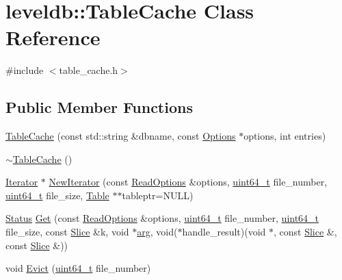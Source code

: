 \hypertarget{classleveldb_1_1_table_cache}{}\section{leveldb\+:\+:Table\+Cache Class Reference}
\label{classleveldb_1_1_table_cache}


{\ttfamily \#include $<$table\+\_\+cache.\+h$>$}

\subsection*{Public Member Functions}
\begin{DoxyCompactItemize}
\item 
\hyperlink{classleveldb_1_1_table_cache_acca8df0a6305b166a7c88f27d1b3e377}{Table\+Cache} (const std\+::string \&dbname, const \hyperlink{structleveldb_1_1_options}{Options} $\ast$options, int entries)
\item 
\hyperlink{classleveldb_1_1_table_cache_a5690fd10ea7cc7f0d44c8e768bea872c}{$\sim$\+Table\+Cache} ()
\item 
\hyperlink{classleveldb_1_1_iterator}{Iterator} $\ast$ \hyperlink{classleveldb_1_1_table_cache_afe8c83b1cbbf3bfc06c66a69611aa250}{New\+Iterator} (const \hyperlink{structleveldb_1_1_read_options}{Read\+Options} \&options, \hyperlink{stdint_8h_aaa5d1cd013383c889537491c3cfd9aad}{uint64\+\_\+t} file\+\_\+number, \hyperlink{stdint_8h_aaa5d1cd013383c889537491c3cfd9aad}{uint64\+\_\+t} file\+\_\+size, \hyperlink{classleveldb_1_1_table}{Table} $\ast$$\ast$tableptr=N\+U\+L\+L)
\item 
\hyperlink{classleveldb_1_1_status}{Status} \hyperlink{classleveldb_1_1_table_cache_af43ba38b52742e9f5589321747535444}{Get} (const \hyperlink{structleveldb_1_1_read_options}{Read\+Options} \&options, \hyperlink{stdint_8h_aaa5d1cd013383c889537491c3cfd9aad}{uint64\+\_\+t} file\+\_\+number, \hyperlink{stdint_8h_aaa5d1cd013383c889537491c3cfd9aad}{uint64\+\_\+t} file\+\_\+size, const \hyperlink{classleveldb_1_1_slice}{Slice} \&k, void $\ast$\hyperlink{env__posix_8cc_a9ce2ec4812a92cb6ab39f6e81e9173a9}{arg}, void($\ast$handle\+\_\+result)(void $\ast$, const \hyperlink{classleveldb_1_1_slice}{Slice} \&, const \hyperlink{classleveldb_1_1_slice}{Slice} \&))
\item 
void \hyperlink{classleveldb_1_1_table_cache_a57b81c58ff0533514b3a5d1652f044bc}{Evict} (\hyperlink{stdint_8h_aaa5d1cd013383c889537491c3cfd9aad}{uint64\+\_\+t} file\+\_\+number)
\end{DoxyCompactItemize}


